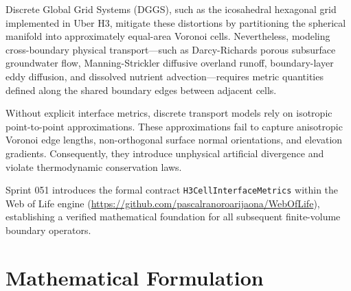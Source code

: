 \documentclass[10pt,journal,compsoc]{IEEEtran}
\begin{document}
Discrete Global Grid Systems (DGGS), such as the icosahedral hexagonal grid implemented in Uber H3, mitigate these distortions by partitioning the spherical manifold into approximately equal-area Voronoi cells. Nevertheless, modeling cross-boundary physical transport—such as Darcy-Richards porous subsurface groundwater flow, Manning-Strickler diffusive overland runoff, boundary-layer eddy diffusion, and dissolved nutrient advection—requires metric quantities defined along the shared boundary edges between adjacent cells.

Without explicit interface metrics, discrete transport models rely on isotropic point-to-point approximations. These approximations fail to capture anisotropic Voronoi edge lengths, non-orthogonal surface normal orientations, and elevation gradients. Consequently, they introduce unphysical artificial divergence and violate thermodynamic conservation laws.

Sprint 051 introduces the formal contract \texttt{H3CellInterfaceMetrics} within the Web of Life engine (\url{https://github.com/pascalranoroarijaona/WebOfLife}), establishing a verified mathematical foundation for all subsequent finite-volume boundary operators.

\section{Mathematical Formulation}
\end{document}
